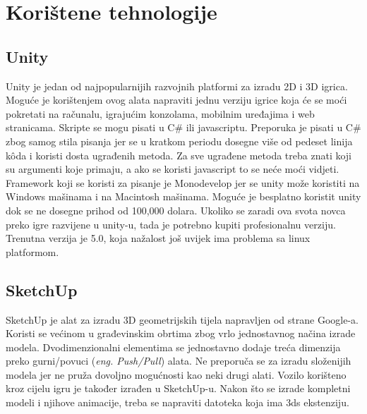 \section{Korištene tehnologije}
\subsection{Unity}
Unity je jedan od najpopularnijih razvojnih platformi za izradu 2D i 3D igrica. Moguće je korištenjem ovog alata napraviti jednu verziju igrice koja će se moći pokretati na računalu, igrajućim konzolama, mobilnim uređajima i web stranicama.
\vspace{2mm}
\newline Skripte se mogu pisati u C\# ili javascriptu. Preporuka je pisati u C\# zbog samog stila pisanja jer se u kratkom periodu dosegne više od pedeset linija k\^oda i koristi dosta ugrađenih metoda. Za sve ugrađene metoda treba znati koji su argumenti koje primaju, a ako se koristi javascript to se neće moći vidjeti. Framework koji se koristi za pisanje je Monodevelop jer se unity može koristiti na Windows mašinama i na Macintosh mašinama.
\vspace{2mm}
\newline Moguće je besplatno koristit unity dok se ne dosegne prihod od 100,000 dolara. Ukoliko se zaradi ova svota novca preko igre razvijene u unity-u, tada je potrebno kupiti profesionalnu verziju. Trenutna verzija je 5.0, koja nažalost još uvijek ima problema sa linux platformom.

\subsection{SketchUp}
SketchUp je alat za izradu 3D geometrijskih tijela napravljen od strane Google-a. Koristi se većinom u građevinskim obrtima zbog vrlo jednostavnog načina izrade modela. Dvodimenzionalni elementima se jednostavno dodaje treća dimenzija preko gurni/povuci (\emph{eng. Push/Pull}) alata. Ne preporuča se za izradu složenijih modela jer ne pruža dovoljno mogućnosti kao neki drugi alati. 
\vspace{2mm}
\newline Vozilo korišteno kroz cijelu igru je također izrađen u SketchUp-u. Nakon što se izrade kompletni modeli i njihove animacije, treba se napraviti datoteka koja ima 3ds ekstenziju.


